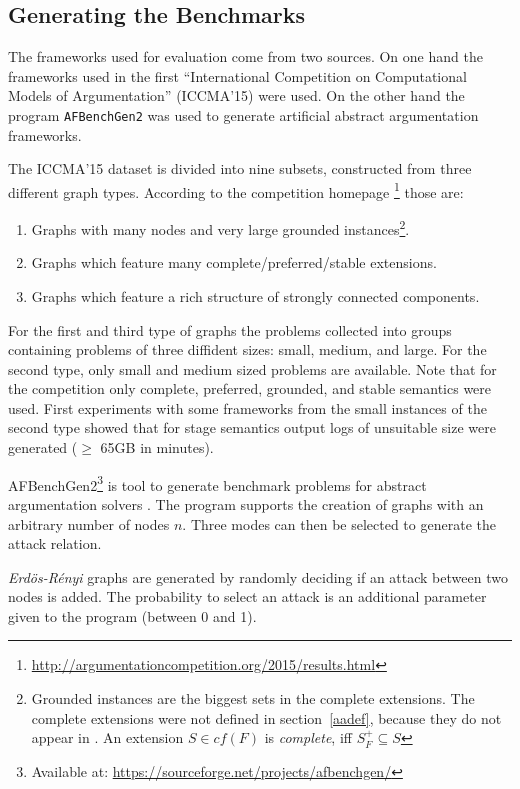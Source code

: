 \documentclass[parskip=half]{scrartcl}
\begin{document}
\subsection{Generating the Benchmarks}
\label{gen_bench}
The frameworks used for evaluation come from two sources. On one hand
the frameworks used in the first ``International Competition on Computational
Models of Argumentation'' (ICCMA'15) were used. On the other hand
the program \texttt{AFBenchGen2} was used to generate artificial
abstract argumentation frameworks.

The ICCMA'15 dataset is divided into nine subsets, constructed from
three different graph types. According to the competition homepage
\footnote{\url{http://argumentationcompetition.org/2015/results.html}} those
are:
\begin{enumerate}
  \item Graphs with many nodes and very large grounded instances\footnote{
  Grounded instances are the biggest sets in the complete extensions. The complete
  extensions were not defined in section~\ref{aadef}, because they do not appear
  in \cite{linsbichler2015hidden}. An extension $S\in cf(F)$ is \emph{complete}, iff
  $S_F^{+}\subseteq S$}.
  \item Graphs which feature many complete/preferred/stable extensions.
  \item Graphs which feature a rich structure of strongly connected components.
\end{enumerate}
For the first and third type of graphs the problems collected into groups
containing problems of three diffident sizes: small, medium, and large. For the
second type, only small and medium sized problems are available. Note that for
the competition only complete, preferred, grounded, and stable semantics were
used. First experiments with some frameworks from the small instances of the
second type showed that for stage semantics output logs of unsuitable size were
generated ($\geq$ 65GB in minutes).

AFBenchGen2\footnote{Available at:
\url{https://sourceforge.net/projects/afbenchgen/}} is tool to generate
benchmark problems for abstract argumentation solvers \cite{afbenchgen2}. The
program supports the creation of graphs with an arbitrary number of nodes $n$.
Three modes can then be selected to generate the attack relation.

\emph{Erdös-Rényi} graphs are generated by randomly deciding if an attack
between two nodes is added. The probability to select an attack is an additional
parameter given to the program (between 0 and 1).
\end{document}
